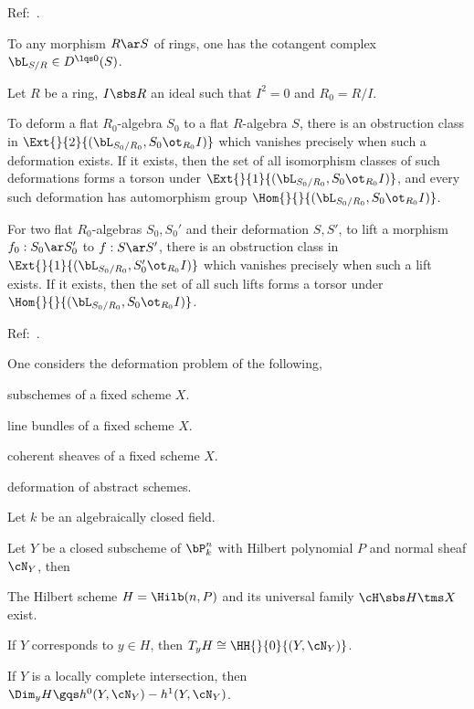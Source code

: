 \documentclass[a4paper, twoside]{article}
\begin{document}
\confighead{}{}{}


Ref:~\cite{Illusie1971,Illusie1972}.

\begin{stp}
	To any morphism $R\ar S$ of rings, one has the cotangent complex $\bL_{S/R}\in D^{\lqs0}(S)$.
\end{stp}

\begin{thm}
	Let $R$ be a ring, $I\sbs R$ an ideal such that $I^{2}=0$ and $R_{0}=R/I$.

	To deform a flat $R_{0}$-algebra $S_{0}$ to a flat $R$-algebra $S$, there is an obstruction class in $\Ext{}{2}{(\bL_{S_{0}/R_{0}},S_{0}\ot_{R_{0}}I)}$ which vanishes precisely when such a deformation exists. If it exists, then the set of all isomorphism classes of such deformations forms a torson under $\Ext{}{1}{(\bL_{S_{0}/R_{0}},S_{0}\ot_{R_{0}}I)}$, and every such deformation has automorphism group $\Hom{}{}{(\bL_{S_{0}/R_{0}},S_{0}\ot_{R_{0}}I)}$.

	For two flat $R_{0}$-algebras $S_{0},S_{0}'$ and their deformation $S,S'$, to lift a morphism $f_{0}:S_{0}\ar S_{0}'$ to $f:S\ar S'$, there is an obstruction class in $\Ext{}{1}{(\bL_{S_{0}/R_{0}},S_{0}'\ot_{R_{0}}I)}$ which vanishes precisely when such a lift exists. If it exists, then the set of all such lifts forms a torsor under $\Hom{}{}{(\bL_{S_{0}/R_{0}},S_{0}\ot_{R_{0}}I)}$.
\end{thm}



Ref:~\cite{Hartshorne2010}.

One considers the deformation problem of the following,
\begin{enr}[label=(\Alph*)]
	\item subschemes of a fixed scheme $X$.
	\item line bundles of a fixed scheme $X$.
	\item coherent sheaves of a fixed scheme $X$.
	\item deformation of abstract schemes.
\end{enr}

\begin{stp}
	Let $k$ be an algebraically closed field.
\end{stp}

\begin{thm}
	Let $Y$ be a closed subscheme of $\bP_{k}^{n}$ with Hilbert polynomial $P$ and normal sheaf $\cN_{Y}$, then
	\begin{itm}
		\item The Hilbert scheme $H=\Hilb(n,P)$ and its universal family $\cH\sbs H\tms X$ exist.
		\item If $Y$ corresponds to $y\in H$, then $T_{y}H\cong\HH{}{0}{(Y,\cN_{Y})}$.
		\item If $Y$ is a locally complete intersection, then $\Dim_{y}H\gqs h^{0}(Y,\cN_{Y})-h^{1}(Y,\cN_{Y})$.
	\end{itm}
\end{thm}
\end{document}
